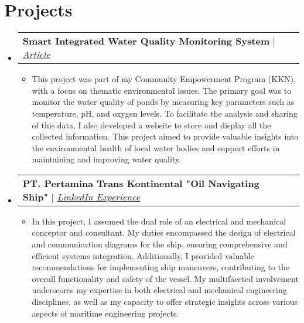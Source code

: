 \documentclass[letterpaper,11pt]{article}
\makeatletter
\newcommand{\resumeItem}[1]{
  \item\small{
    {#1 \vspace{-2pt}}
  }
}
\newcommand{\resumeProjectHeading}[2]{
    \vspace{-2pt}\item
    \begin{tabular*}{0.97\textwidth}{l@{\extracolsep{\fill}}r}
      \small#1 & #2 \\
    \end{tabular*}\vspace{-7pt}
}
\newcommand{\resumeSubHeadingListStart}{\begin{itemize}[leftmargin=0.15in, label={}]}
\newcommand{\resumeSubHeadingListEnd}{\end{itemize}}
\newcommand{\resumeItemListStart}{\begin{itemize}}
\newcommand{\resumeItemListEnd}{\end{itemize}\vspace{-5pt}}
\makeatother
\begin{document}
\section{Projects}
    \vspace{3pt}
    \resumeSubHeadingListStart            
      \resumeProjectHeading
        {\textbf{Smart Integrated Water Quality Monitoring System} $|$ \emph{\href{https://www.its.ac.id/news/2023/09/12/bantu-petambak-abmas-its-gagas-alat-pengontrol-kualitas-air/}{\color{blue}Article}}}{}
          \resumeItemListStart
            \resumeItem{This project was part of my Community Empowerment Program (KKN), with a focus on thematic environmental issues. The primary goal was to monitor the water quality of ponds by measuring key parameters such as temperature, pH, and oxygen levels. To facilitate the analysis and sharing of this data, I also developed a website to store and display all the collected information. This project aimed to provide valuable insights into the environmental health of local water bodies and support efforts in maintaining and improving water quality.}
          \resumeItemListEnd

     \resumeProjectHeading
        {\textbf{PT. Pertamina Trans Kontinental "Oil Navigating Ship"} $|$ \emph{\href{https://www.linkedin.com/in/jonathan-oktaviano/details/projects/}{\color{blue}LinkedIn Experience}}}{}
          \resumeItemListStart
            \resumeItem{In this project, I assumed the dual role of an electrical and mechanical conceptor and consultant. My duties encompassed the design of electrical and communication diagrams for the ship, ensuring comprehensive and efficient systems integration. Additionally, I provided valuable recommendations for implementing ship maneuvers, contributing to the overall functionality and safety of the vessel. My multifaceted involvement underscores my expertise in both electrical and mechanical engineering disciplines, as well as my capacity to offer strategic insights across various aspects of maritime engineering projects.}
          \resumeItemListEnd
          
    \resumeSubHeadingListEnd

    
\end{document}

